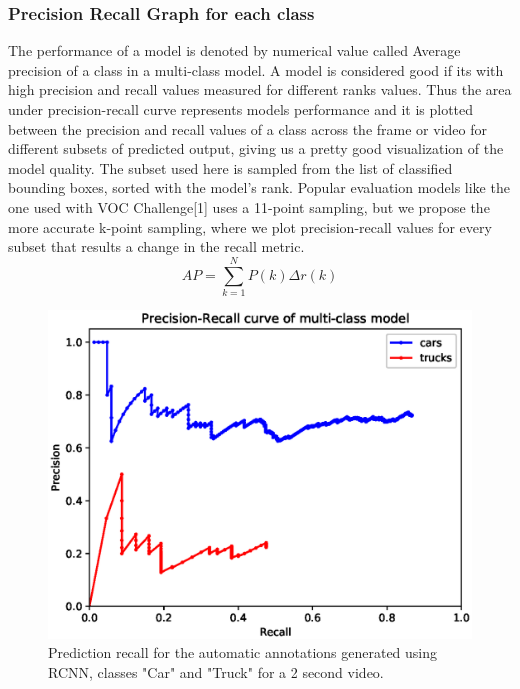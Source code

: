 \documentclass[conference]{IEEEtran}
\newcommand{\figwidthb}{0.80\linewidth}
\begin{document}
\subsubsection{Precision Recall Graph for each class}
The performance of a model is denoted by numerical value called Average precision of a class in a multi-class model. A model is considered good if its with high precision and recall values measured for different ranks values. Thus the area under precision-recall curve represents models performance and it is plotted between the precision and recall values of a class across the frame or video for different subsets of predicted output, giving us a pretty good visualization of the model quality. The subset used here is sampled from the list of classified bounding boxes, sorted with the model's rank. Popular evaluation models like the one used with VOC Challenge[1] uses a 11-point sampling, but we propose the more accurate k-point sampling, where we plot precision-recall values for every subset that results a change in the recall metric.
	$${AP} = \sum_{k=1}^{N} P(k) {\Delta}r(k)$$
\begin{figure}[!htb]
\centering
\includegraphics[width=\figwidthb]{fig/pr_rcnn.eps}
\caption{Prediction recall for the automatic annotations generated using RCNN, classes "Car" and "Truck" for a 2 second video.} \label{fig.structure}
\end{figure}
\end{document}
